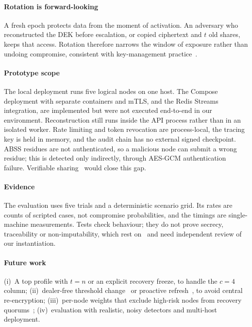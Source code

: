 \documentclass[conference]{IEEEtran}
\begin{document}
\paragraph*{Rotation is forward-looking} A fresh epoch protects data from the moment of activation. An adversary who reconstructed the DEK before escalation, or copied ciphertext and $t$ old shares, keeps that access. Rotation therefore narrows the window of exposure rather than undoing compromise, consistent with key-management practice~\cite{barker2020keymgmt}.

\paragraph*{Prototype scope} The local deployment runs five logical nodes on one host. The Compose deployment with separate containers and mTLS, and the Redis Streams integration, are implemented but were not executed end-to-end in our environment. Reconstruction still runs inside the API process rather than in an isolated worker. Rate limiting and token revocation are process-local, the tracing key is held in memory, and the audit chain has no external signed checkpoint. ABSS residues are not authenticated, so a malicious node can submit a wrong residue; this is detected only indirectly, through AES-GCM authentication failure. Verifiable sharing~\cite{feldman1987vss,pedersen1991vss} would close this gap.

\paragraph*{Evidence} The evaluation uses five trials and a deterministic scenario grid. Its rates are counts of scripted cases, not compromise probabilities, and the timings are single-machine measurements. Tests check behaviour; they do not prove secrecy, traceability or non-imputability, which rest on~\cite{leslie2025traceable} and need independent review of our instantiation.

\paragraph*{Future work} (i)~A top profile with $t=n$ or an explicit recovery freeze, to handle the $c=4$ column; (ii)~dealer-free threshold change~\cite{martin1999changing,steinfeld2007lattice} or proactive refresh~\cite{herzberg1995proactive}, to avoid central re-encryption; (iii)~per-node weights that exclude high-risk nodes from recovery quorums~\cite{nojoumian2010social}; (iv)~evaluation with realistic, noisy detectors and multi-host deployment.
\end{document}
